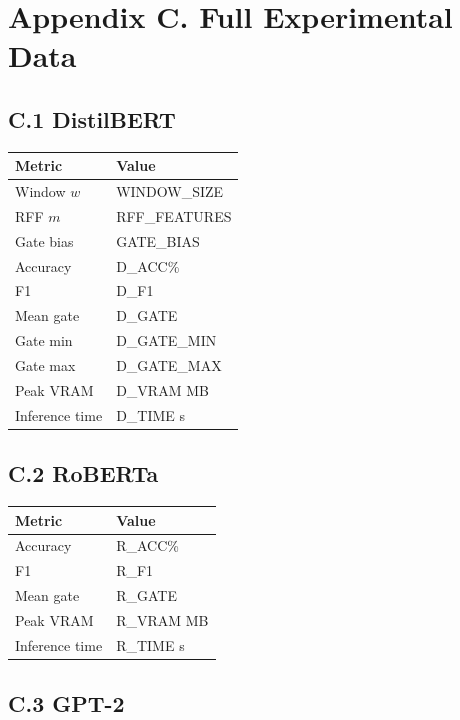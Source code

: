 
\section{Appendix C. Full Experimental Data}

\subsection{C.1 DistilBERT}

\begin{table}[H]
\centering
\small
\begin{tabular}{ll}
\toprule
\textbf{Metric} & \textbf{Value} \\
\midrule
Window $w$ & {{WINDOW\_SIZE}} \\
RFF $m$ & {{RFF\_FEATURES}} \\
Gate bias & {{GATE\_BIAS}} \\
Accuracy & {{D\_ACC}}\% \\
F1 & {{D\_F1}} \\
Mean gate & {{D\_GATE}} \\
Gate min & {{D\_GATE\_MIN}} \\
Gate max & {{D\_GATE\_MAX}} \\
Peak VRAM & {{D\_VRAM}} MB \\
Inference time & {{D\_TIME}} s \\
\bottomrule
\end{tabular}
\end{table}

\subsection{C.2 RoBERTa}

\begin{table}[H]
\centering
\small
\begin{tabular}{ll}
\toprule
\textbf{Metric} & \textbf{Value} \\
\midrule
Accuracy & {{R\_ACC}}\% \\
F1 & {{R\_F1}} \\
Mean gate & {{R\_GATE}} \\
Peak VRAM & {{R\_VRAM}} MB \\
Inference time & {{R\_TIME}} s \\
\bottomrule
\end{tabular}
\end{table}

\subsection{C.3 GPT-2}

